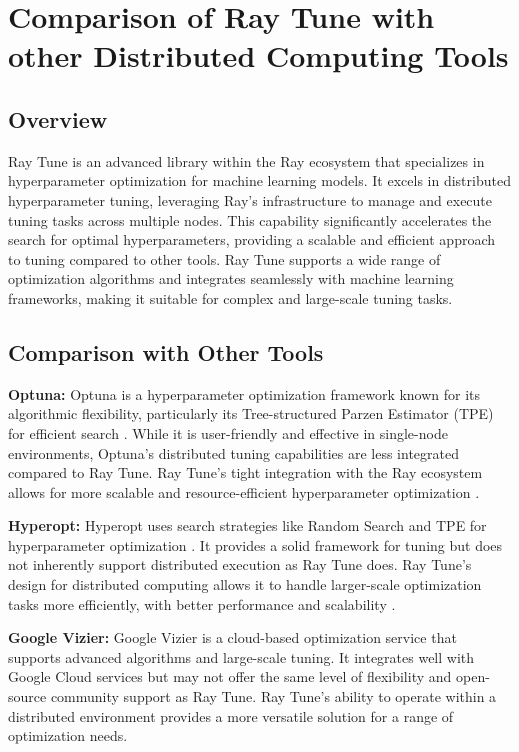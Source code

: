\section{Comparison of Ray Tune with other Distributed Computing Tools}

\subsection{Overview}

Ray Tune is an advanced library within the Ray ecosystem that specializes in hyperparameter optimization for machine learning models. It excels in distributed hyperparameter tuning, leveraging Ray's infrastructure to manage and execute tuning tasks across multiple nodes. This capability significantly accelerates the search for optimal hyperparameters, providing a scalable and efficient approach to tuning compared to other tools. Ray Tune supports a wide range of optimization algorithms and integrates seamlessly with machine learning frameworks, making it suitable for complex and large-scale tuning tasks. \cite{anyscale_ray_tune}

\subsection{Comparison with Other Tools}

\textbf{Optuna:} Optuna is a hyperparameter optimization framework known for its algorithmic flexibility, particularly its Tree-structured Parzen Estimator (TPE) for efficient search \cite{akiba2019optuna}. While it is user-friendly and effective in single-node environments, Optuna's distributed tuning capabilities are less integrated compared to Ray Tune. Ray Tune’s tight integration with the Ray ecosystem allows for more scalable and resource-efficient hyperparameter optimization \cite{anyscale_ray_tune}.

\textbf{Hyperopt:} Hyperopt uses search strategies like Random Search and TPE for hyperparameter optimization \cite{bergstra2013hyperopt}. It provides a solid framework for tuning but does not inherently support distributed execution as Ray Tune does. Ray Tune’s design for distributed computing allows it to handle larger-scale optimization tasks more efficiently, with better performance and scalability \cite{anyscale_ray_tune}.

\textbf{Google Vizier:} Google Vizier is a cloud-based optimization service that supports advanced algorithms and large-scale tuning. It integrates well with Google Cloud services but may not offer the same level of flexibility and open-source community support as Ray Tune. Ray Tune’s ability to operate within a distributed environment provides a more versatile solution for a range of optimization needs. \cite{google_vizier}

